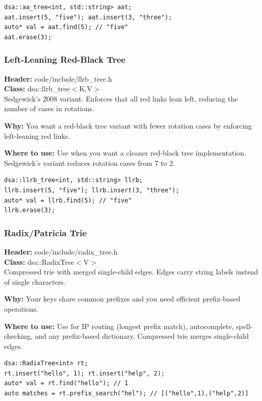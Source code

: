 \documentclass[11pt]{article}
\begin{document}
\begin{lstlisting}
dsa::aa_tree<int, std::string> aat;
aat.insert(5, "five"); aat.insert(3, "three");
auto* val = aat.find(5); // "five"
aat.erase(3);
\end{lstlisting}

\subsubsection{Left-Leaning Red-Black Tree}
\textbf{Header:} code/include/llrb\_tree.h\\
\textbf{Class:} dsa::llrb\_tree$<$K,V$>$\\

Sedgewick's 2008 variant. Enforces that all red links lean left, reducing the number of cases in rotations.

\textbf{Why:} You want a red-black tree variant with fewer rotation cases by enforcing left-leaning red links. \par \textbf{Where to use:} Use when you want a cleaner red-black tree implementation. Sedgewick's variant reduces rotation cases from 7 to 2.

\begin{lstlisting}
dsa::llrb_tree<int, std::string> llrb;
llrb.insert(5, "five"); llrb.insert(3, "three");
auto* val = llrb.find(5); // "five"
llrb.erase(3);
\end{lstlisting}

\subsubsection{Radix/Patricia Trie}
\textbf{Header:} code/include/radix\_tree.h\\
\textbf{Class:} dsa::RadixTree$<$V$>$\\

Compressed trie with merged single-child edges. Edges carry string labels instead of single characters.

\textbf{Why:} Your keys share common prefixes and you need efficient prefix-based operations. \par \textbf{Where to use:} Use for IP routing (longest prefix match), autocomplete, spell-checking, and any prefix-based dictionary. Compressed trie merges single-child edges.

\begin{lstlisting}
dsa::RadixTree<int> rt;
rt.insert("hello", 1); rt.insert("help", 2);
auto* val = rt.find("hello"); // 1
auto matches = rt.prefix_search("hel"); // [("hello",1),("help",2)]
\end{lstlisting}
\end{document}
